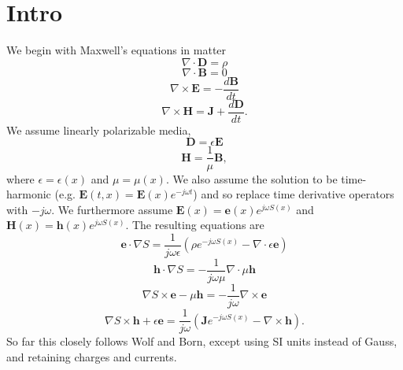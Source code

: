 \documentclass{article}
\newcommand{\Div}[0]{\nabla\cdot}
\newcommand{\Curl}[0]{\nabla\times}
\theoremstyle{plain}
\begin{document}
\section{Intro}\label{sec:intro}

We begin with Maxwell's equations in matter
\begin{equation}
	\Div\mathbf{D} = \rho
\end{equation}
\begin{equation}
	\Div\mathbf{B} = 0
\end{equation}
\begin{equation}
	\Curl\mathbf{E} = -\frac{d\mathbf{B}}{dt}
\end{equation}
\begin{equation}
	\Curl\mathbf{H} = \mathbf{J} + \frac{d\mathbf{D}}{dt}.
\end{equation}
We assume linearly polarizable media,
\begin{equation}
	\mathbf{D} = \epsilon\mathbf{E}
\end{equation}
\begin{equation}
	\mathbf{H} = \frac{1}{\mu}\mathbf{B},
\end{equation}
where $\epsilon=\epsilon(x)$ and $\mu=\mu(x)$. We also assume the solution to be time-harmonic
(e.g. $\mathbf{E}(t,x)=\mathbf{E}(x)e^{-j\omega t}$) and so replace time derivative operators with $-j\omega$.
We furthermore assume $\mathbf{E}(x) = \mathbf{e}(x)e^{j\omega S(x)}$ and $\mathbf{H}(x) = \mathbf{h}(x)e^{j\omega S(x)}$.
The resulting equations are
\begin{equation}\label{eq:max1}
	\mathbf{e}\cdot\nabla S = \frac{1}{j\omega\epsilon}\left( \rho e^{-j\omega S(x)} - \Div\epsilon\mathbf{e} \right)
\end{equation}
\begin{equation}\label{eq:max2}
	\mathbf{h}\cdot\nabla S = -\frac{1}{j\omega\mu}\Div\mu\mathbf{h}
\end{equation}
\begin{equation}\label{eq:max3}
	\nabla S\times\mathbf{e} - \mu\mathbf{h} = -\frac{1}{j\omega}\Curl\mathbf{e}
\end{equation}
\begin{equation}\label{eq:max4}
	\nabla S\times\mathbf{h} + \epsilon\mathbf{e} = \frac{1}{j\omega}\left( \mathbf{J}e^{-j\omega S(x)} - \Curl\mathbf{h} \right).
\end{equation}
So far this closely follows Wolf and Born, except using SI units instead of Gauss, and retaining charges and currents.
\end{document}
